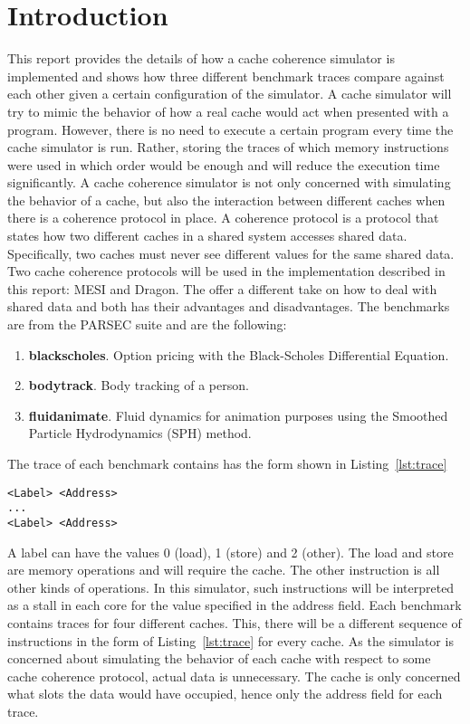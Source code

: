 \section{Introduction}

This report provides the details of how a cache coherence simulator is implemented and shows how three different benchmark traces compare against each other given a certain configuration of the simulator.
A cache simulator will try to mimic the behavior of how a real cache would act when presented with a program.
However, there is no need to execute a certain program every time the cache simulator is run.
Rather, storing the traces of which memory instructions were used in which order would be enough and will reduce the execution time significantly.
A cache coherence simulator is not only concerned with simulating the behavior of a cache, but also the interaction between different caches when there is a coherence protocol in place.
A coherence protocol is a protocol that states how two different caches in a shared system accesses shared data. Specifically, two caches must never see different values for the same shared data.
Two cache coherence protocols will be used in the implementation described in this report: MESI and Dragon.
The offer a different take on how to deal with shared data and both has their advantages and disadvantages.
The benchmarks are from the PARSEC suite and are the following:
\begin{enumerate}
    \item \textbf{blackscholes}. Option pricing with the Black-Scholes Differential Equation.
    \item \textbf{bodytrack}. Body tracking of a person.
    \item \textbf{fluidanimate}. Fluid dynamics for animation purposes using the Smoothed Particle Hydrodynamics (SPH) method.
\end{enumerate}
The trace of each benchmark contains has the form shown in Listing~\ref{lst:trace}

\begin{lstlisting}[label=lst:trace]
<Label> <Address>
...
<Label> <Address>
\end{lstlisting}
A label can have the values 0 (load), 1 (store) and 2 (other). The load and store are memory operations and will require the cache.
The other instruction is all other kinds of operations.
In this simulator, such instructions will be interpreted as a stall in each core for the value specified in the address field.
Each benchmark contains traces for four different caches.
This, there will be a different sequence of instructions in the form of Listing~\ref{lst:trace} for every cache.
As the simulator is concerned about simulating the behavior of each cache with respect to some cache coherence protocol, actual data is unnecessary.
The cache is only concerned what slots the data would have occupied, hence only the address field for each trace.


